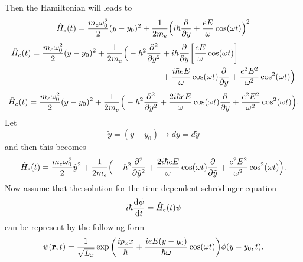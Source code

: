 \noindent
Then the Hamiltonian will leads to
\begin{equation} \label{1.13}
    \hat{H}_e(t) =
      \frac{m_e \omega_0^2}{2}(y-y_0)^2 +
      \frac{1}{2m_e}\Big(i\hbar \pdv{y}+\frac{eE}{\omega}\cos(\omega t)\Big)^2
\end{equation}
\begin{equation} \label{1.14}
  \begin{aligned}
    \hat{H}_e(t) =
      \frac{m_e \omega_0^2}{2}(y-y_0)^2 +
      \frac{1}{2m_e}\Big(
      -\hbar^2 \pdv[2]{y} & +
      i\hbar \pdv{y}\bigg[\frac{eE}{\omega}\cos(\omega t) \bigg] \\ & +
      \frac{i\hbar eE}{\omega}\cos(\omega t) \pdv{y}+
      \frac{e^2E^2}{\omega^2}\cos[2](\omega t)
      \Big)
  \end{aligned}
\end{equation}
\begin{equation} \label{1.15}
  \begin{aligned}
    \hat{H}_e(t) =
      \frac{m_e \omega_0^2}{2}(y-y_0)^2 +
      \frac{1}{2m_e}\Big(
      -\hbar^2 \pdv[2]{y} +
      \frac{2i\hbar eE}{\omega}\cos(\omega t) \pdv{y}+
      \frac{e^2E^2}{\omega^2}\cos[2](\omega t)
      \Big).
  \end{aligned}
\end{equation}
Let
\begin{equation} \label{1.16}
    \tilde{y} = (y - y_0) \longrightarrow dy = d\tilde{y}
\end{equation}
and then this becomes
\begin{equation} \label{1.17}
  \begin{aligned}
    \hat{H}_e(t) =
      \frac{m_e \omega_0^2}{2}\tilde{y}^2 +
      \frac{1}{2m_e}\Big(
      -\hbar^2 \pdv[2]{\tilde{y}} +
      \frac{2i\hbar eE}{\omega}\cos(\omega t) \pdv{\tilde{y}}+
      \frac{e^2E^2}{\omega^2}\cos[2](\omega t)
      \Big).
  \end{aligned}
\end{equation}
Now assume that the solution for the time-dependent schrödinger equation
\begin{equation} \label{1.18}
    i \hbar \dv{\psi}{t} = \hat{H}_e(t)\psi
\end{equation}
can be represent by the following form
\begin{equation} \label{1.19}
    \psi(\vb{r},t) = \frac{1}{\sqrt{L_x}} \exp\bigg(
      \frac{ip_x x}{\hbar} +
      \frac{ieE(y-y_0)}{\hbar \omega}\cos(\omega t)
    \bigg) \phi(y-y_0,t).
\end{equation}
